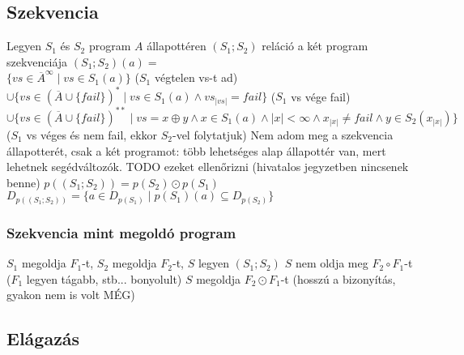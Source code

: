 \documentclass[12pt,a4paper]{article}
\begin{document}
\subsection{Szekvencia}

\begin{outline}
	\1 Legyen $S_1$ és $S_2$ program $A$ állapottéren
	\1 $(S_1;S_2)$ reláció a két program szekvenciája
	\1 $(S_1;S_2)(a) =$\\
	$\{vs \in \overline{A}^\infty \;|\; vs \in S_1(a)\}$ \;\;\;($S_1$ végtelen vs-t ad)\\
	$\cup \{vs \in (\overline{A} \cup \{fail\})^* \;|\; vs \in S_1(a) \wedge vs_{|vs|}=fail\}$ \;\;\;($S_1$ vs vége fail)\\
	$\cup \{vs \in (\overline{A} \cup \{fail\})^{**} \;|\; vs=x \oplus y \wedge x \in S_1(a) \wedge |x| < \infty \wedge x_{|x|} \ne fail \wedge y \in S_2(x_{|x|}) \}$
	\;\;\;($S_1$ vs véges és nem fail, ekkor $S_2$-vel folytatjuk)
	\1 Nem adom meg a szekvencia állapotterét, csak a két programot: több lehetséges alap állapottér van, mert lehetnek segédváltozók.
	\1 TODO ezeket ellenőrizni (hivatalos jegyzetben nincsenek benne)
		\2 $p((S_1;S_2))=p(S_2) \odot p(S_1)$
		\2 $D_{p((S_1;S_2))}=\{a \in D_{p(S_1)} \;|\; p(S_1)(a) \subseteq D_{p(S_2)} \}$
\end{outline}

\subsubsection{Szekvencia mint megoldó program}

\begin{outline}
	\1 $S_1$ megoldja $F_1$-t, $S_2$ megoldja $F_2$-t, $S$ legyen $(S_1;S_2)$
	\1 $S$ nem oldja meg $F_2 \circ F_1$-t ($F_1$ legyen tágabb, stb... bonyolult)
	\1 $S$ megoldja $F_2 \odot F_1$-t (hosszú a bizonyítás, gyakon nem is volt MÉG)
\end{outline}

\pagebreak

\subsection{Elágazás}
\end{document}
